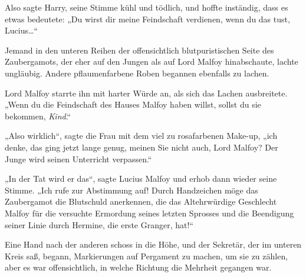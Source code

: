 Also sagte Harry, seine Stimme kühl und tödlich, und hoffte inständig, dass es etwas bedeutete: „Du wirst dir meine Feindschaft verdienen, wenn du das tust, Lucius…“

Jemand in den unteren Reihen der offensichtlich blutpuristischen Seite des Zaubergamots, der eher auf den Jungen als auf Lord Malfoy hinabschaute, lachte ungläubig. Andere pflaumenfarbene Roben begannen ebenfalls zu lachen.

Lord Malfoy starrte ihn mit harter Würde an, als sich das Lachen ausbreitete.
„Wenn du die Feindschaft des Hauses Malfoy haben willst, sollst du sie bekommen, \emph{Kind}.“

„Also wirklich“, sagte die Frau mit dem viel zu rosafarbenen Make-up, „ich denke, das ging jetzt lange genug, meinen Sie nicht auch, Lord Malfoy? Der Junge wird seinen Unterricht verpassen.“

„In der Tat wird er das“, sagte Lucius Malfoy und erhob dann wieder seine Stimme. „Ich rufe zur Abstimmung auf! Durch Handzeichen möge das Zaubergamot die Blutschuld anerkennen, die das Altehrwürdige Geschlecht Malfoy für die versuchte Ermordung seines letzten Sprosses und die Beendigung seiner Linie durch Hermine, die erste Granger, hat!“

Eine Hand nach der anderen schoss in die Höhe, und der Sekretär, der im unteren Kreis saß, begann, Markierungen auf Pergament zu machen, um sie zu zählen, aber es war offensichtlich, in welche Richtung die Mehrheit gegangen war.

